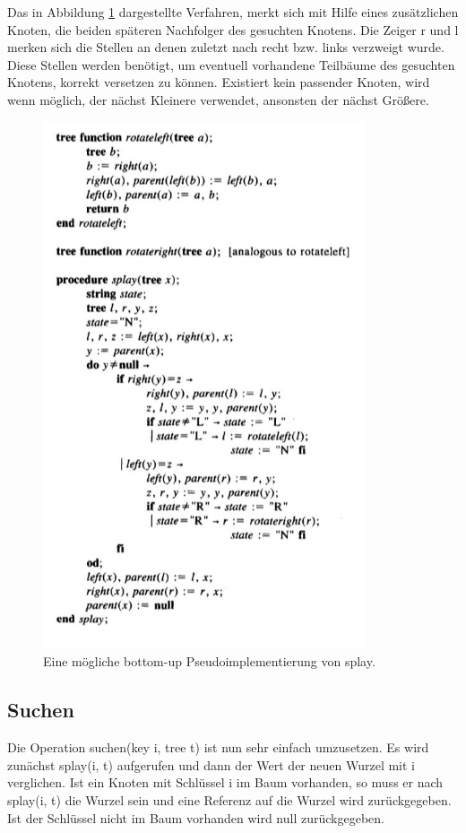 \documentclass[11pt, a4paper]{article}
\begin{document}
	\noindent Das in Abbildung \ref{fig:splayAlgorithmusBottomUp} dargestellte Verfahren, merkt sich mit Hilfe eines zusätzlichen Knoten, die beiden späteren Nachfolger des gesuchten Knotens. Die Zeiger r und l merken sich die Stellen an denen zuletzt nach recht bzw. links verzweigt wurde. Diese Stellen werden benötigt, um eventuell vorhandene Teilbäume des gesuchten Knotens, korrekt versetzen zu können.
	Existiert kein passender Knoten, wird wenn möglich, der nächst Kleinere verwendet, ansonsten der nächst Größere.  
	\begin{figure}[H]
		\centering
		\includegraphics[width=0.85\textwidth]{"bilder/splayAlgorithmusBottomUp"}
		\caption{Eine mögliche bottom-up Pseudoimplementierung von splay. \cite{sl1} }
		\label{fig:splayAlgorithmusBottomUp}
	\end{figure}
	

	\subsection{Suchen}
	Die Operation suchen(key i, tree t) ist nun sehr einfach umzusetzen. Es wird zunächst splay(i, t) aufgerufen und dann der Wert der neuen Wurzel mit i verglichen. Ist ein Knoten mit Schlüssel i im Baum vorhanden, so muss er nach splay(i, t) die Wurzel sein und eine Referenz auf die Wurzel wird zurückgegeben. Ist der Schlüssel nicht im Baum vorhanden wird null zurückgegeben.
\end{document}
